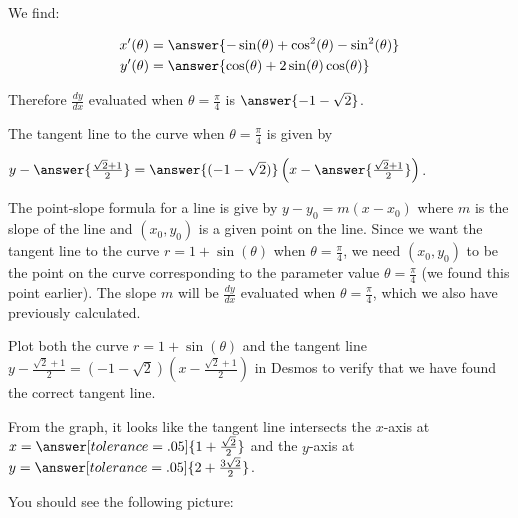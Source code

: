 \documentclass{ximera}
\begin{document}
\begin{exercise}
\begin{exercise}
\begin{hint}
We find:

\begin{align*}
x'(\theta)&=\answer{ -\sin(\theta)+\cos^2(\theta)-\sin^2(\theta)} \\
y'(\theta)&=\answer{ \cos(\theta)+2\sin(\theta)\cos(\theta) }
\end{align*} 

Therefore $\frac{dy}{dx}$ evaluated when $\theta=\frac{\pi}{4}$ is $\answer{ -1-\sqrt{2}   }$.


\end{hint}

\begin{exercise}

The tangent line to the curve when $\theta=\frac{\pi}{4}$ is given by 

$y-\answer{\frac{\sqrt{2}+1}{2}   }=\answer{ ( -1-\sqrt{2} )  }\left( x- \answer{  \frac{\sqrt{2}+1}{2} }  \right)$. 

\begin{hint}


The point-slope formula for a line is give by $y-y_{0}=m(x-x_{0})$ where $m$ is the slope of the line and $(x_{0},y_{0})$ is a given point on the line. 
Since we want the tangent line to the curve $r=1+\sin(\theta)$ when $\theta=\frac{\pi}{4}$, we need $(x_{0},y_{0})$ to be the point on the curve corresponding to the parameter value $\theta=\frac{\pi}{4}$ (we found this point earlier). The slope $m$ will be $\frac{dy}{dx}$ evaluated when $\theta=\frac{\pi}{4}$, which we also have previously calculated. 

\end{hint}

\begin{exercise}
Plot both the curve $r= 1 + \sin(\theta)$ and the tangent line $y-\frac{\sqrt{2}+1}{2}   = ( -1-\sqrt{2} )  \left( x-  \frac{\sqrt{2}+1}{2}   \right)$ in Desmos to verify that we have found the correct tangent line.  

From the graph, it looks like the tangent line intersects the $x$-axis at $x=\answer[tolerance=.05]{ 1+ \frac{\sqrt{2}}{2} }$ and the $y$-axis at $y=\answer[tolerance=.05]{2+\frac{3\sqrt{2}}{2}}$.

\begin{hint}
You should see the following picture:


\end{hint}
\end{exercise}
\end{exercise}
\end{exercise}
\end{exercise}
\end{document}
